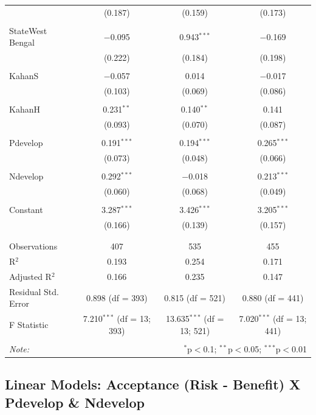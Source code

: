 \documentclass[
]{article}
\begin{document}
\begin{table}[!htbp]
\begin{tabular}{@{\extracolsep{5pt}}lccc}
  & (0.187) & (0.159) & (0.173) \\ 
  & & & \\ 
 StateWest Bengal & $-$0.095 & 0.943$^{***}$ & $-$0.169 \\ 
  & (0.222) & (0.184) & (0.198) \\ 
  & & & \\ 
 KahanS & $-$0.057 & 0.014 & $-$0.017 \\ 
  & (0.103) & (0.069) & (0.086) \\ 
  & & & \\ 
 KahanH & 0.231$^{**}$ & 0.140$^{**}$ & 0.141 \\ 
  & (0.093) & (0.070) & (0.087) \\ 
  & & & \\ 
 Pdevelop & 0.191$^{***}$ & 0.194$^{***}$ & 0.265$^{***}$ \\ 
  & (0.073) & (0.048) & (0.066) \\ 
  & & & \\ 
 Ndevelop & 0.292$^{***}$ & $-$0.018 & 0.213$^{***}$ \\ 
  & (0.060) & (0.068) & (0.049) \\ 
  & & & \\ 
 Constant & 3.287$^{***}$ & 3.426$^{***}$ & 3.205$^{***}$ \\ 
  & (0.166) & (0.139) & (0.157) \\ 
  & & & \\ 
\hline \\[-1.8ex] 
Observations & 407 & 535 & 455 \\ 
R$^{2}$ & 0.193 & 0.254 & 0.171 \\ 
Adjusted R$^{2}$ & 0.166 & 0.235 & 0.147 \\ 
Residual Std. Error & 0.898 (df = 393) & 0.815 (df = 521) & 0.880 (df = 441) \\ 
F Statistic & 7.210$^{***}$ (df = 13; 393) & 13.635$^{***}$ (df = 13; 521) & 7.020$^{***}$ (df = 13; 441) \\ 
\hline 
\hline \\[-1.8ex] 
\textit{Note:}  & \multicolumn{3}{r}{$^{*}$p$<$0.1; $^{**}$p$<$0.05; $^{***}$p$<$0.01} \\ 
\end{tabular} 
\end{table} 
\endgroup

\newpage

\hypertarget{linear-models-acceptance-risk---benefit-x-pdevelop-ndevelop}{%
\subsection{Linear Models: Acceptance (Risk - Benefit) X Pdevelop \&
Ndevelop}\label{linear-models-acceptance-risk---benefit-x-pdevelop-ndevelop}}
\end{document}
